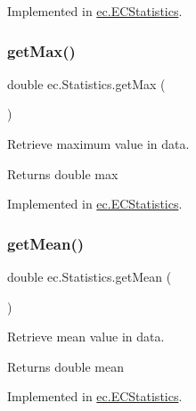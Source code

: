 Implemented in \hyperlink{classec_1_1_e_c_statistics_abb7e2fa1c13cea018e3cf1e2a82309db}{ec.\+E\+C\+Statistics}.

\mbox{\label{interfaceec_1_1_statistics_a1cf8e3f12f56957e4133ce4cd07277dc}} 
\subsubsection{\texorpdfstring{get\+Max()}{getMax()}}
{\footnotesize\ttfamily double ec.\+Statistics.\+get\+Max (\begin{DoxyParamCaption}{ }\end{DoxyParamCaption})}



Retrieve maximum value in data. 

\begin{DoxyReturn}{Returns}
double max 
\end{DoxyReturn}


Implemented in \hyperlink{classec_1_1_e_c_statistics_a5585b02f584a18bef7a792b76710c225}{ec.\+E\+C\+Statistics}.

\mbox{\label{interfaceec_1_1_statistics_aa25ad8afd473f6540041526226d946bd}} 
\subsubsection{\texorpdfstring{get\+Mean()}{getMean()}}
{\footnotesize\ttfamily double ec.\+Statistics.\+get\+Mean (\begin{DoxyParamCaption}{ }\end{DoxyParamCaption})}



Retrieve mean value in data. 

\begin{DoxyReturn}{Returns}
double mean 
\end{DoxyReturn}


Implemented in \hyperlink{classec_1_1_e_c_statistics_a62f3366afb939bb372e1ec1fd5aec3bc}{ec.\+E\+C\+Statistics}.

\mbox{\label{interfaceec_1_1_statistics_acee86eecccfe2d050c9a13a11f235d8d}} 
